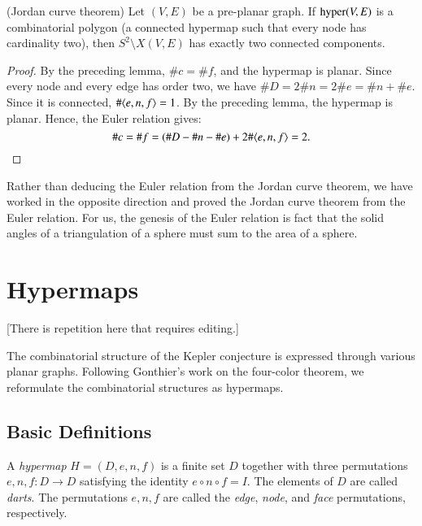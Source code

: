 \begin{lemma} (Jordan curve theorem)  Let $(V,E)$ be a pre-planar
graph.   If ${\operatorname{hyper}}(V,E)$ is a combinatorial polygon (a
connected hypermap such that every node has cardinality two), then
$S^2\setminus X(V,E)$ has exactly two connected components.
\end{lemma}

\begin{proof} By the preceding lemma, $\# c = \#f$, and the
hypermap is planar.  Since every node and every edge has order two,
we have $\#D = 2\#n = 2\# e = \#n +\#e$.  Since it is connected,
$\#\langle e,n,f\rangle = 1$.  By the preceding lemma, the hypermap is
planar. Hence, the Euler relation gives:
    $$
    \#c = \#f = (\#D - \#n - \#e) + 2\#\langle e,n,f\rangle =2.
    $$
\end{proof}

\begin{remark}   Rather than deducing the Euler relation from the Jordan
curve theorem, we have worked in the opposite direction and proved
the Jordan curve theorem from the Euler relation.  For us, the
genesis of the Euler relation is fact that the solid angles of a
triangulation of a sphere must sum to the area of a sphere.
\end{remark}




\section{Hypermaps}

[There is repetition here that requires editing.]

The combinatorial structure of the Kepler conjecture is expressed
through various planar graphs.  Following Gonthier's work on the
four-color theorem, we reformulate the combinatorial structures as
hypermaps.

\subsection{Basic Definitions}

\begin{definition}  A {\it hypermap} $H=(D,e,n,f)$ is a finite set $D$
together with three permutations $e,n,f:D\to D$ satisfying the
identity $e\circ n\circ f = I$.  The elements of $D$ are called
{\it darts}.  The permutations $e,n,f$ are called the {\it edge},
{\it node}, and {\it face} permutations, respectively.
\end{definition}

